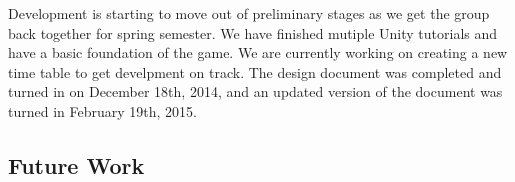 \documentclass[12pt]{article}       %
\begin{document}
Development is starting to move out of preliminary stages as we get the group back together for spring semester. We have finished mutiple Unity tutorials and have a basic foundation of the game. We are currently working on creating a new time table to get develpment on track. The design document was completed and turned in on December 18th, 2014, and an updated version of the document was turned in February 19th, 2015. 

\subsection{Future Work}






\newpage
\end{document}
